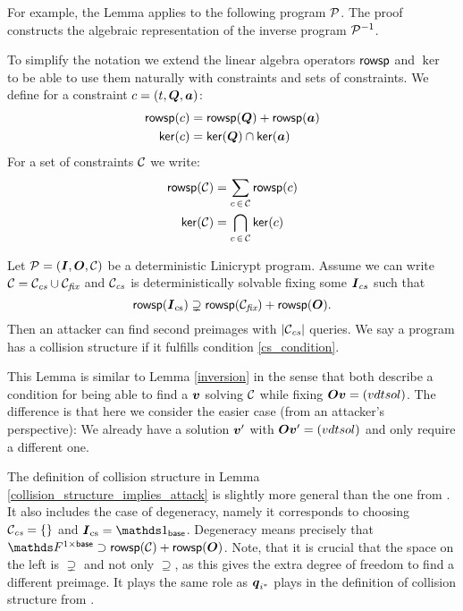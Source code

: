 For example, the Lemma applies to the following program $\P$. 
The proof constructs the algebraic representation of the inverse program $\P^{-1}$.
\begin{pchstack}[center,space=2cm]
\end{pchstack}

To simplify the notation we extend the linear algebra operators $\rowsp$ and $\ker$
to be able to use them naturally with constraints and sets of constraints.
We define for a constraint $c = (t, \Q, \va)$:
\begin{align*}
\rowsp(c) &= \rowsp(\Q) + \rowsp(\va) \\
\ker(c) &= \ker(\Q) \cap \ker(\va)
\end{align*}
For a set of constraints $\C$ we write:
\begin{align*}
\rowsp(\C) &= \sum_{c \, \in \, \C} \rowsp(c) \\
\ker(\C) &= \bigcap_{c \, \in \, \C} \ker(c)
\end{align*}

\begin{lemma}
\label{collision_structure_implies_attack}
    Let $\P = (\I, \O, \C)$ be a deterministic Linicrypt program.
    Assume we can write $\C = \Ccs \cup \Cfix$ and
    $\Ccs$ is deterministically solvable fixing some $\I_{cs}$ such that
    \begin{equation}
    \label{cs_condition}
        \rowsp(\I_\textrm{cs}) \supsetneq \rowsp(\Cfix) + \rowsp(\O).
    \end{equation}
    Then an attacker can find second preimages with $|\Ccs|$ queries.
    We say a program has a collision structure if it fulfills condition \eqref{cs_condition}.
\end{lemma}

This Lemma is similar to Lemma \ref{inversion} in the sense that both describe a condition for being able to find a $\vv$ solving $\C$ while fixing $\O\vv = \vec o l$.
The difference is that here we consider the easier case (from an attacker's perspective):
We already have a solution $\vv'$ with $\O \vv' = \vec o l$ and only require a different one. 

The definition of collision structure in Lemma \ref{collision_structure_implies_attack}
is slightly more general than the one from \cite{TCC:McQSwoRos19}.
It also includes the case of degeneracy, 
namely it corresponds to choosing $\Ccs = \{\}$ and $\I_\textrm{cs} = \Id_\base$.
Degeneracy means precisely that $\F^{1\times\base} \supset \rowsp(\C) + \rowsp(\O)$.
Note, that it is crucial that the space on the left is $\supsetneq$ and not only $\supseteq$,
as this gives the extra degree of freedom to find a different preimage.
It plays the same role as $\vq_{i^*}$ plays in the definition of collision structure from \cite{TCC:McQSwoRos19}.

